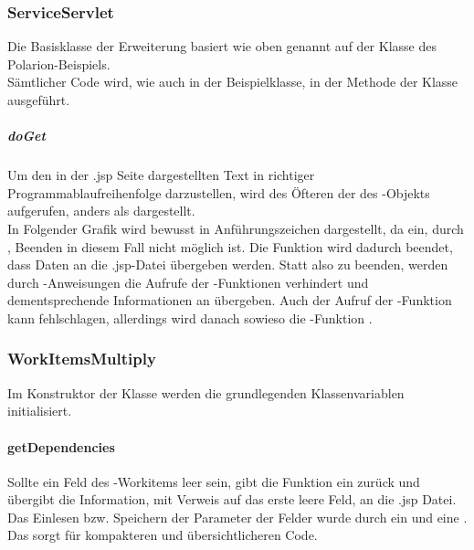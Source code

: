 \subsubsection{ServiceServlet}
\label{sub:serv}
Die Basisklasse der Erweiterung basiert wie oben genannt auf der Klasse des Polarion-Beispiels.\\
Sämtlicher Code wird, wie auch in der Beispielklasse, in der  Methode der Klasse ausgeführt.
\newpage
\subparagraph{doGet}
Um den in der \glq.jsp\grq{} Seite dargestellten Text in richtiger Programmablaufreihenfolge darzustellen, wird des Öfteren der   des -Objekts aufgerufen, anders als dargestellt.\\
In Folgender Grafik wird  bewusst in Anführungszeichen dargestellt, da ein, durch , Beenden in diesem Fall nicht möglich ist.
Die Funktion wird dadurch beendet, dass Daten an die \glq.jsp\grq{}-Datei übergeben werden. Statt also zu beenden, werden durch -Anweisungen die Aufrufe der -Funktionen verhindert und dementsprechende Informationen an  übergeben. Auch der Aufruf der -Funktion kann fehlschlagen, allerdings wird danach sowieso die -Funktion .
\subsubsection{WorkItemsMultiply}
\label{sub:workitemsm}
Im Konstruktor der Klasse werden die grundlegenden Klassenvariablen initialisiert.
\paragraph{getDependencies}
Sollte ein Feld des -Workitems leer sein, gibt die Funktion ein  zurück und  übergibt die Information, mit Verweis auf das erste leere Feld, an die \glq.jsp\grq{} Datei. Das Einlesen bzw. Speichern der Parameter der Felder wurde durch ein  und eine . Das sorgt für kompakteren und übersichtlicheren Code.
\newpage
